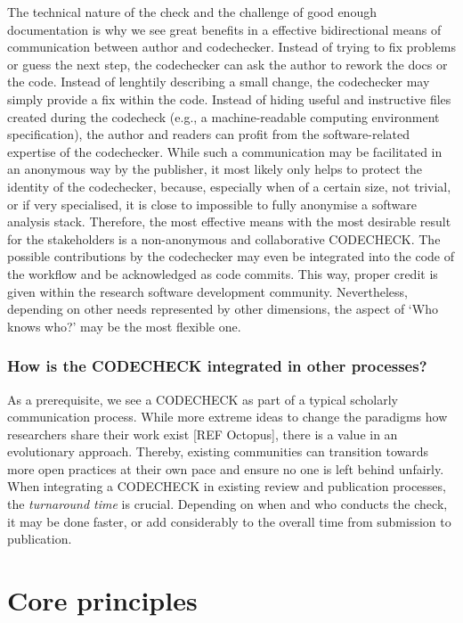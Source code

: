 \documentclass[12pt]{article}
\begin{document}
The technical nature of the check and the challenge of good enough 
documentation is why we see great benefits in a effective bidirectional
means of communication between author and codechecker. Instead of trying to
fix problems or guess the next step, the codechecker can ask the author to 
rework the docs  or the code.
Instead of lenghtily describing a small change, the codechecker may simply
provide a fix within the code.
Instead of hiding useful and  instructive files created during the codecheck
(e.g., a machine-readable computing environment specification), the author 
and readers can profit from the software-related expertise of the
codechecker.
While such a communication may be facilitated in an anonymous way by the 
publisher, it most likely only helps to protect the identity of the 
codechecker, because, especially when of a certain size, not trivial, or 
if very specialised, it is close to impossible to fully anonymise a 
software analysis stack.
Therefore, the most effective means with the most desirable result for
the stakeholders is a non-anonymous and collaborative CODECHECK.
The possible contributions by the codechecker may even be integrated into
the code of the workflow and be acknowledged as code commits. This way, 
proper credit is given within the research software development community.
Nevertheless, depending on other needs represented by other dimensions,
the aspect of `Who knows who?' may be the most flexible one.

\subsubsection*{How is the CODECHECK integrated in other processes?}\label{turnaround-time}

As a prerequisite, we see a CODECHECK as part of a typical scholarly
communication process. While more extreme ideas to change the paradigms
how researchers share their work exist [REF Octopus], there is a 
value in an evolutionary approach. Thereby, existing communities can 
transition towards more open practices at their own pace and ensure
no one is left behind unfairly.
When integrating a CODECHECK in existing review and publication processes,
the \emph{turnaround time} is crucial. Depending on when and who conducts
the check, it may be done faster, or add considerably to the overall
time from submission to publication.

\section*{Core principles}\label{core-principles}
\end{document}
